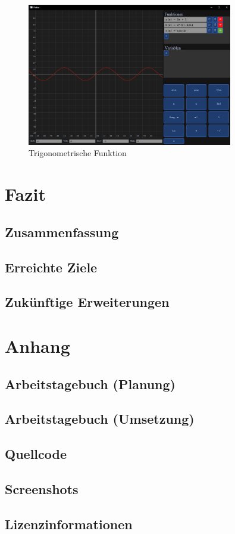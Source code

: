 \documentclass[a4paper]{article}
\begin{document}
\begin{enumerate}
	      \begin{figure}[ht]
		      \centering
		      \includegraphics[width=0.8\textwidth]{Resources/example_trigonometric.png}
		      \caption{Trigonometrische Funktion}
		      \label{fig:example_trigonometric}
	      \end{figure}
\end{enumerate}

\newpage

\section{Fazit}

\subsection{Zusammenfassung}

\subsection{Erreichte Ziele}

\subsection{Zukünftige Erweiterungen}

\section{Anhang}

\subsection{Arbeitstagebuch (Planung)}

\subsection{Arbeitstagebuch (Umsetzung)}

\subsection{Quellcode}

\subsection{Screenshots}

\subsection{Lizenzinformationen}
\end{document}
